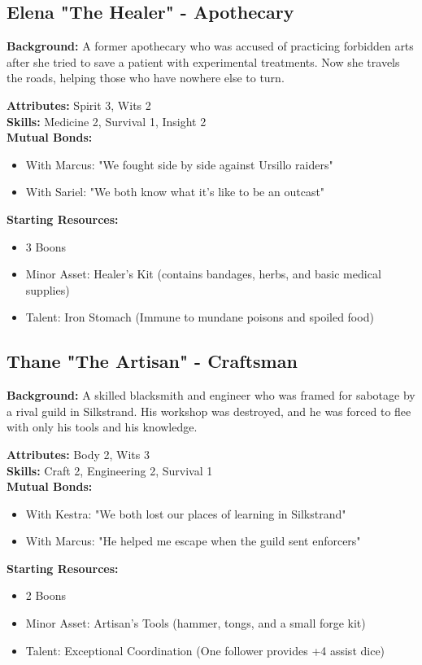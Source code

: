 \documentclass[11pt]{article}
\newenvironment{characterbox}[1]{%
  \begin{mdframed}[backgroundcolor=shadecolor, linewidth=1pt, linecolor=headercolor]%
  \subsection*{#1}%
}{%
  \end{mdframed}%
}
\begin{document}
\begin{characterbox}{Elena "The Healer" - Apothecary}
\textbf{Background:} A former apothecary who was accused of practicing forbidden arts after she tried to save a patient with experimental treatments. Now she travels the roads, helping those who have nowhere else to turn.

\textbf{Attributes:} Spirit 3, Wits 2 \\
\textbf{Skills:} Medicine 2, Survival 1, Insight 2 \\
\textbf{Mutual Bonds:} 
\begin{itemize}
\item With Marcus: "We fought side by side against Ursillo raiders"
\item With Sariel: "We both know what it's like to be an outcast"
\end{itemize}

\textbf{Starting Resources:}
\begin{itemize}
\item 3 Boons
\item Minor Asset: Healer's Kit (contains bandages, herbs, and basic medical supplies)
\item Talent: Iron Stomach (Immune to mundane poisons and spoiled food)
\end{itemize}
\end{characterbox}

\begin{characterbox}{Thane "The Artisan" - Craftsman}
\textbf{Background:} A skilled blacksmith and engineer who was framed for sabotage by a rival guild in Silkstrand. His workshop was destroyed, and he was forced to flee with only his tools and his knowledge.

\textbf{Attributes:} Body 2, Wits 3 \\
\textbf{Skills:} Craft 2, Engineering 2, Survival 1 \\
\textbf{Mutual Bonds:} 
\begin{itemize}
\item With Kestra: "We both lost our places of learning in Silkstrand"
\item With Marcus: "He helped me escape when the guild sent enforcers"
\end{itemize}

\textbf{Starting Resources:}
\begin{itemize}
\item 2 Boons
\item Minor Asset: Artisan's Tools (hammer, tongs, and a small forge kit)
\item Talent: Exceptional Coordination (One follower provides +4 assist dice)
\end{itemize}
\end{characterbox}
\end{document}
